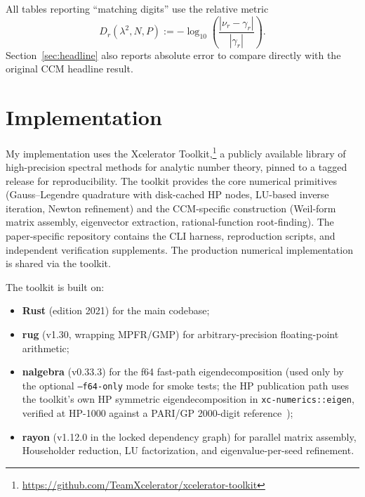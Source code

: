 \documentclass[11pt,a4paper]{article}
\begin{document}
All tables reporting ``matching digits'' use the relative metric
\begin{equation}
D_r(\lambda^2,N,P)
:=-\log_{10}\!\left(\frac{|\nu_r-\gamma_r|}{|\gamma_r|}\right).
\label{eq:matching-digits}
\end{equation}
Section~\ref{sec:headline} also reports absolute error to compare
directly with the original CCM headline result.

\section{Implementation}

My implementation uses the Xcelerator
Toolkit,\footnote{\url{https://github.com/TeamXcelerator/xcelerator-toolkit}}
a publicly available library of high-precision spectral methods for
analytic number theory, pinned to a tagged release for reproducibility.
The toolkit provides the core numerical primitives
(Gauss--Legendre quadrature with disk-cached HP nodes, LU-based
inverse iteration, Newton refinement) and the CCM-specific
construction (Weil-form matrix assembly, eigenvector extraction,
rational-function root-finding). The paper-specific repository contains
the CLI harness, reproduction scripts, and independent verification
supplements. The production numerical implementation is shared via
the toolkit.

The toolkit is built on:
\begin{itemize}
\item \textbf{Rust} (edition 2021) for the main codebase;
\item \textbf{rug} (v1.30, wrapping MPFR/GMP) for arbitrary-precision
floating-point arithmetic;
\item \textbf{nalgebra} (v0.33.3) for the f64 fast-path eigendecomposition
(used only by the optional \texttt{--f64-only} mode for smoke tests; the
HP publication path uses the toolkit's own HP symmetric eigendecomposition
in \texttt{xc-numerics::eigen}, verified at HP-1000 against a PARI/GP
2000-digit reference~\cite{PARI});
\item \textbf{rayon} (v1.12.0 in the locked dependency graph) for parallel
matrix assembly, Householder
reduction, LU factorization, and eigenvalue-per-seed refinement.
\end{itemize}
\end{document}
